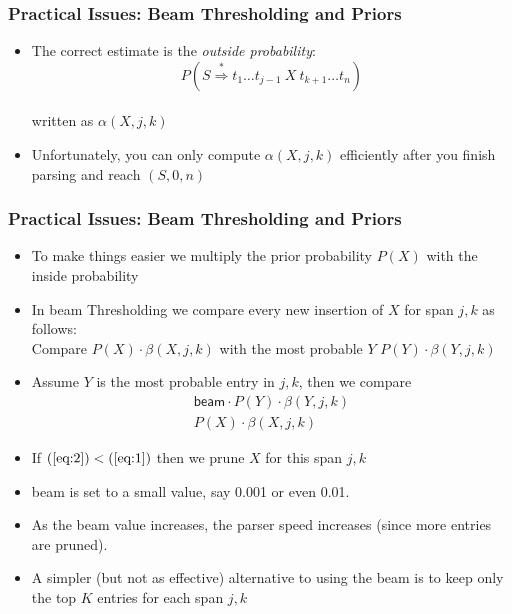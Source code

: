 \begin{frame}
\frametitle{Practical Issues: Beam Thresholding and Priors}
\begin{itemize}
\item The correct estimate is the {\em outside probability}: 
\[ P(S \stackrel{*}{\Rightarrow} t_1 \ldots t_{j-1}\ X\ t_{k+1} \ldots
t_n) \]\\
written as $\alpha(X, j, k)$ 
\item Unfortunately, you can only compute $\alpha(X, j, k)$
efficiently after you finish parsing and reach $(S, 0, n)$
\end{itemize}
\end{frame}

\begin{frame}
\frametitle{Practical Issues: Beam Thresholding and Priors}
\begin{itemize}
\item To make things easier we multiply the prior probability $P(X)$
with the inside probability
\item In beam Thresholding we compare every new insertion of $X$ for
span $j, k$ as follows:\\
Compare $P(X) \cdot \beta(X,j,k)$ with the most probable $Y$ $P(Y) \cdot
\beta(Y,j,k)$
\item Assume $Y$ is the most probable entry in $j,k$, then we compare
\begin{eqnarray}
\textsf{beam} \cdot P(Y) \cdot \beta(Y,j,k) \label{eq:1} \\
P(X) \cdot \beta(X,j,k) \label{eq:2}
\end{eqnarray}
\item If $(\ref{eq:2}) < (\ref{eq:1})$ then we prune $X$ for this span $j,k$ 
\item \textsf{beam} is set to a small value, say 0.001 or even 0.01. 
\item As the beam value increases, the parser speed increases (since more entries are pruned).
\item A simpler (but not as effective) alternative to using the beam is to keep only the top $K$ entries for each span $j,k$
\end{itemize}
\end{frame}

